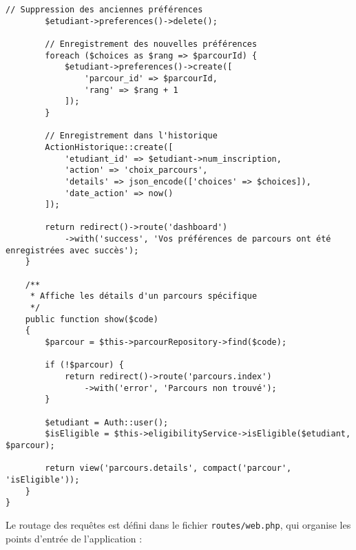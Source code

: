 \documentclass[french,12pt]{report} %
\begin{document}
\begin{lstlisting}[style=phpstyle,caption={ParcoursController - Gestion de la sélection des parcours}]
        // Suppression des anciennes préférences
        $etudiant->preferences()->delete();
        
        // Enregistrement des nouvelles préférences
        foreach ($choices as $rang => $parcourId) {
            $etudiant->preferences()->create([
                'parcour_id' => $parcourId,
                'rang' => $rang + 1
            ]);
        }
        
        // Enregistrement dans l'historique
        ActionHistorique::create([
            'etudiant_id' => $etudiant->num_inscription,
            'action' => 'choix_parcours',
            'details' => json_encode(['choices' => $choices]),
            'date_action' => now()
        ]);
        
        return redirect()->route('dashboard')
            ->with('success', 'Vos préférences de parcours ont été enregistrées avec succès');
    }
    
    /**
     * Affiche les détails d'un parcours spécifique
     */
    public function show($code)
    {
        $parcour = $this->parcourRepository->find($code);
        
        if (!$parcour) {
            return redirect()->route('parcours.index')
                ->with('error', 'Parcours non trouvé');
        }
        
        $etudiant = Auth::user();
        $isEligible = $this->eligibilityService->isEligible($etudiant, $parcour);
        
        return view('parcours.details', compact('parcour', 'isEligible'));
    }
}
\end{lstlisting}

Le routage des requêtes est défini dans le fichier \texttt{routes/web.php}, qui organise les points d'entrée de l'application :
\end{document}
